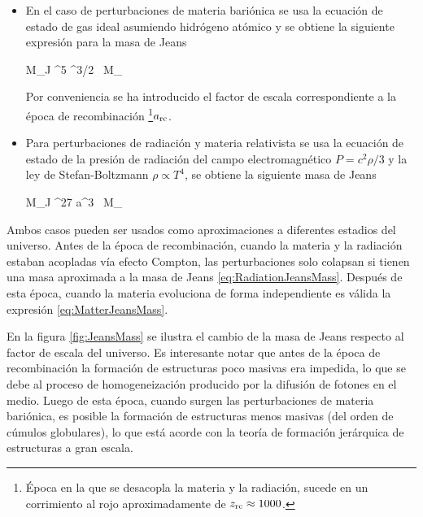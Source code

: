 \begin{itemize}
\item En el caso de perturbaciones de materia bariónica se usa la ecuación 
de estado de gas ideal asumiendo hidrógeno atómico y se obtiene la
siguiente expresión para la masa de Jeans


{ M_{J} ^5
^{3/2} \mbox{ M}_{\odot}}


Por conveniencia se ha introducido el factor de escala correspondiente a la 
época de recombinación \footnote{Época en la que se desacopla la
materia y la radiación, sucede en un corrimiento al rojo aproximadamente de
$z_{\mbox{\scriptsize{rc}}}\approx 1000$.}$a_{\mbox{\scriptsize{rc}}}$.


\item Para perturbaciones de radiación y materia relativista se usa la 
ecuación de estado de la presión de radiación del campo electromagnético 
\cite{jackson1999} $P = c^2\rho/3$ y la ley de Stefan-Boltzmann
$\rho \propto T^4$, se obtiene la siguiente masa de Jeans


{ M_{J}   ^{27} a^3 \mbox{ M}_{\odot}}
\end{itemize}

	
Ambos casos pueden ser usados como aproximaciones a diferentes estadios del 
universo. Antes de la época de recombinación, cuando la materia y la 
radiación estaban acopladas vía efecto Compton, las perturbaciones solo 
colapsan si tienen una masa aproximada a la masa de Jeans 
\ref{eq:RadiationJeansMass}. Después de esta época, cuando la materia 
evoluciona de forma independiente es válida la expresión 
\ref{eq:MatterJeansMass}.


En la figura \ref{fig:JeansMass} se ilustra el cambio de la masa de Jeans
respecto al factor de escala del universo. Es interesante notar que antes 
de la época de recombinación la formación de estructuras poco masivas era
impedida, lo que se debe al proceso de homogeneización producido por la 
difusión de fotones en el medio. Luego de esta época, cuando surgen las 
perturbaciones de materia bariónica, es posible la formación de estructuras 
menos masivas (del orden de cúmulos globulares), lo que está acorde con la
teoría de formación jerárquica de estructuras a gran escala.


